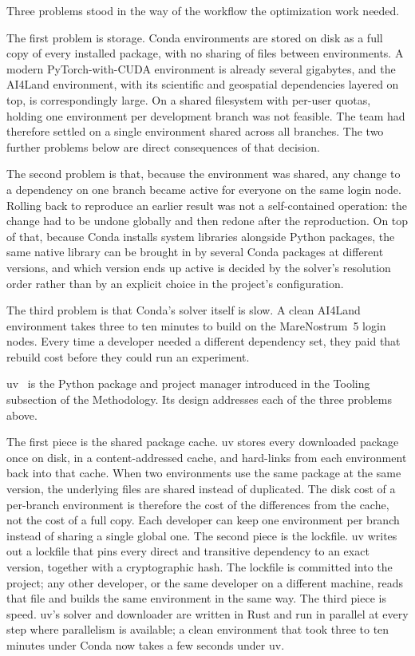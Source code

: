 \documentclass[12pt,a4paper]{article}
\begin{document}
Three problems stood in the way of the workflow the optimization work needed.

The first problem is storage. Conda environments are stored on disk as a full copy of every
installed package, with no sharing of files between environments. A modern PyTorch-with-CUDA
environment is already several gigabytes, and the AI4Land environment, with its scientific and
geospatial dependencies layered on top, is correspondingly large. On a shared filesystem with
per-user quotas, holding one environment per development branch was not feasible. The team had
therefore settled on a single environment shared across all branches. The two further problems
below are direct consequences of that decision.

The second problem is that, because the environment was shared, any change to a dependency on one
branch became active for everyone on the same login node. Rolling back to reproduce an earlier
result was not a self-contained operation: the change had to be undone globally and then redone
after the reproduction. On top of that, because Conda installs system libraries alongside Python
packages, the same native library can be brought in by several Conda packages at different
versions, and which version ends up active is decided by the solver's resolution order rather
than by an explicit choice in the project's configuration.

The third problem is that Conda's solver itself is slow. A clean AI4Land environment takes three
to ten minutes to build on the MareNostrum~5 login nodes. Every time a developer needed a
different dependency set, they paid that rebuild cost before they could run an experiment.

uv~\cite{uv} is the Python package and project manager introduced in the Tooling subsection of
the Methodology. Its design addresses each of the three problems above.

The first piece is the shared package cache. uv stores every downloaded package once on disk, in
a content-addressed cache, and hard-links from each environment back into that cache. When two
environments use the same package at the same version, the underlying files are shared instead
of duplicated. The disk cost of a per-branch environment is therefore the cost of the
differences from the cache, not the cost of a full copy. Each developer can keep one environment
per branch instead of sharing a single global one. The second piece is the lockfile. uv writes
out a lockfile that pins every direct and transitive dependency to an exact version, together
with a cryptographic hash. The lockfile is committed into the project; any other developer, or
the same developer on a different machine, reads that file and builds the same environment in
the same way. The third piece is speed. uv's solver and downloader are written in Rust and run
in parallel at every step where parallelism is available; a clean environment that took three to
ten minutes under Conda now takes a few seconds under uv.
\end{document}
